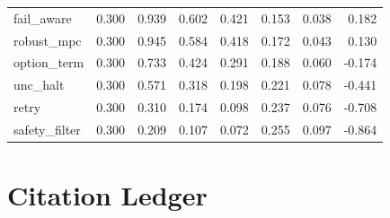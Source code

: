\documentclass{article}
\begin{document}
\begin{longtable}{@{}lrrrrrrr@{}}
fail\_aware & 0.300 & 0.939 & 0.602 & 0.421 & 0.153 & 0.038 & 0.182 \\
robust\_mpc & 0.300 & 0.945 & 0.584 & 0.418 & 0.172 & 0.043 & 0.130 \\
option\_term & 0.300 & 0.733 & 0.424 & 0.291 & 0.188 & 0.060 & -0.174 \\
unc\_halt & 0.300 & 0.571 & 0.318 & 0.198 & 0.221 & 0.078 & -0.441 \\
retry & 0.300 & 0.310 & 0.174 & 0.098 & 0.237 & 0.076 & -0.708 \\
safety\_filter & 0.300 & 0.209 & 0.107 & 0.072 & 0.255 & 0.097 & -0.864 \\
\bottomrule
\end{longtable}

\section{Citation Ledger}
\end{document}
